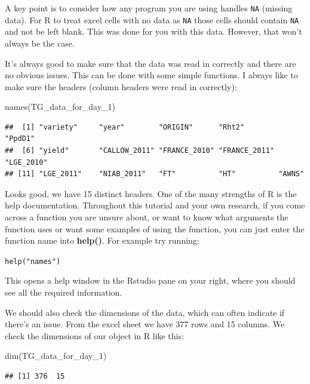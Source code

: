 \documentclass[
]{book}
\newenvironment{Shaded}{\begin{snugshade}}{\end{snugshade}}
\newcommand{\FunctionTok}[1]{\textcolor[rgb]{0.00,0.00,0.00}{#1}}
\newcommand{\NormalTok}[1]{#1}
\begin{document}
A key point is to consider how any program you are using handles \texttt{NA} (missing data). For R to treat excel cells with no data as \texttt{NA} those cells should contain \texttt{NA} and not be left blank. This was done for you with this data. However, that won't always be the case.

It's always good to make sure that the data was read in correctly and there are no obvious issues. This can be done with some simple functions. I always like to make sure the headers (column headers were read in correctly):

\begin{Shaded}
\begin{Highlighting}[]
\FunctionTok{names}\NormalTok{(TG\_data\_for\_day\_1)}
\end{Highlighting}
\end{Shaded}

\begin{verbatim}
##  [1] "variety"     "year"        "ORIGIN"      "Rht2"        "PpdD1"      
##  [6] "yield"       "CALLOW_2011" "FRANCE_2010" "FRANCE_2011" "LGE_2010"   
## [11] "LGE_2011"    "NIAB_2011"   "FT"          "HT"          "AWNS"
\end{verbatim}

Looks good, we have 15 distinct headers. One of the many strengths of R is the help documentation. Throughout this tutorial and your own research, if you come across a function you are unsure about, or want to know what arguments the function uses or want some examples of using the function, you can just enter the function name into \textbf{help()}. For example try running:

\texttt{help("names")}

This opens a help window in the Rstudio pane on your right, where you should see all the required information.

We should also check the dimensions of the data, which can often indicate if there's an issue. From the excel sheet we have 377 rows and 15 columns. We check the dimensions of our object in R like this:

\begin{Shaded}
\begin{Highlighting}[]
\FunctionTok{dim}\NormalTok{(TG\_data\_for\_day\_1)}
\end{Highlighting}
\end{Shaded}

\begin{verbatim}
## [1] 376  15
\end{verbatim}
\end{document}
